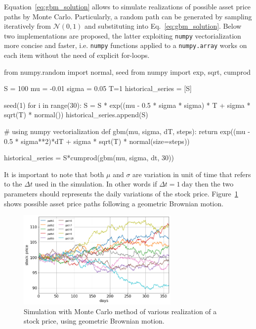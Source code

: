 Equation~\ref{eq:gbm_solution} allows to simulate realizations of possible asset price paths by Monte Carlo. Particularly, a random path can be generated by sampling iteratively from $\mathcal{N}(0,1)$ and substituting into Eq.~\ref{eq:gbm_solution}.
Below two implementations are proposed, the latter exploiting \texttt{numpy} vectorialization more concise and faster, i.e. \texttt{numpy} functions applied to a \texttt{numpy.array} works on each item without the need of explicit for-loops.

\begin{ipythonnon}
from numpy.random import normal, seed
from numpy import exp, sqrt, cumprod

S = 100
mu = -0.01
sigma = 0.05
T=1
historical_series = [S]

seed(1)
for i in range(30):
    S = S * exp((mu - 0.5 * sigma * sigma) * T +
                 sigma * sqrt(T) * normal())
    historical_series.append(S)

# using numpy vectorialization    
def gbm(mu, sigma, dT, steps):
    return exp((mu - 0.5 * sigma**2)*dT + sigma * sqrt(T) * normal(size=steps))

historical_series = S*cumprod(gbm(mu, sigma, dt, 30))
\end{ipythonnon}

It is important to note that both $\mu$ and $\sigma$ are variation in unit of time that refers to the $\Delta t$ used in the simulation. In other words if $\Delta t = 1~\textrm{day}$ then the two parameters should represents the daily variations of the stock price. Figure~\ref{fig:stock_price_sim} shows possible asset price paths following a geometric Brownian motion. 

\begin{figure}[htb]
\centering
\includegraphics[width=0.7\textwidth]{figures/asset_price_simulation}
\caption{Simulation with Monte Carlo method of various realization of a stock price, using geometric Brownian motion.}
\label{fig:stock_price_sim}
\end{figure}

